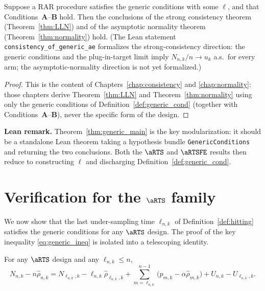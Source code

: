 \begin{theorem}\label{thm:generic_main}
Suppose a RAR procedure satisfies the generic conditions with some $\ell$, and
that Conditions~\textbf{A}--\textbf{B} hold. Then the conclusions of the strong
consistency theorem (Theorem~\ref{thm:LLN}) and of the asymptotic normality
theorem (Theorem~\ref{thm:normality}) hold. (The Lean statement
\texttt{consistency\_of\_generic\_ae} formalizes the strong-consistency direction:
the generic conditions and the plug-in-target limit imply $N_{n,k}/n \to u_k$ a.s.\ for every
arm; the asymptotic-normality direction is not yet formalized.)
\end{theorem}

\begin{proof}
This is the content of Chapters~\ref{chap:consistency} and \ref{chap:normality}:
those chapters derive Theorem~\ref{thm:LLN} and Theorem~\ref{thm:normality}
using only the generic conditions of Definition~\ref{def:generic_cond} (together
with Conditions~\textbf{A}--\textbf{B}), never the specific form of the design.
\end{proof}

\textbf{Lean remark.} Theorem~\ref{thm:generic_main} is the key modularization:
it should be a standalone Lean theorem taking a hypothesis bundle
\texttt{GenericConditions} and returning the two conclusions. Both the $\aRTS$
and $\aRTSFE$ results then reduce to constructing $\ell$ and discharging
Definition~\ref{def:generic_cond}.

\section{Verification for the \texorpdfstring{$\aRTS$}{aRTS} family}
\label{sec:generic_verify}

We now show that the last under-sampling time $\ell_{n,k}$ of
Definition~\ref{def:hitting} satisfies the generic conditions for any $\aRTS$
design. The proof of the key inequality \eqref{eq:generic_ineq} is isolated into
a telescoping identity.

\begin{lemma}\label{lem:U_telescope}
\leanok
{}
For any $\aRTS$ design and any $\ell_{n,k} \le n$,
\[
  N_{n,k} - n\hat{\rho}_{n,k}
  = N_{\ell_{n,k},k} - \ell_{n,k}\hat{\rho}_{\ell_{n,k},k}
    + \sum_{m=\ell_{n,k}}^{n-1}\big(p_{m,k} - \alpha\hat{\rho}_{m,k}\big)
    + U_{n,k} - U_{\ell_{n,k},k}.
\]
\end{lemma}

